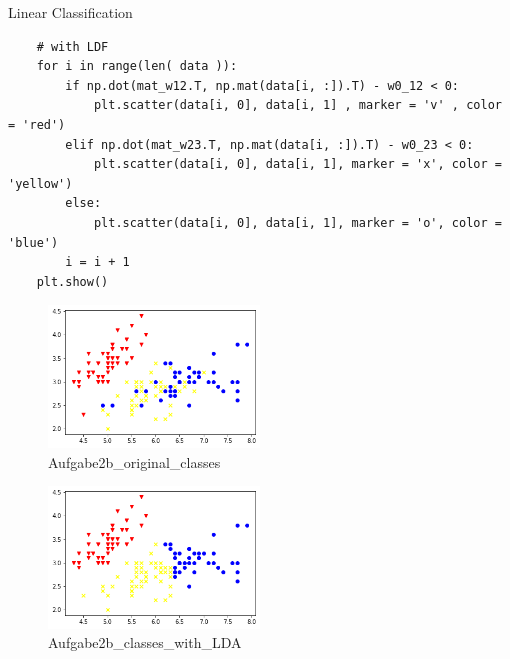\documentclass[
	ngerman,
     solution=true
	]{tudaexercise}
\begin{document}
\begin{task}{Linear Classification}
\begin{subtask}[2b)]
\begin{lstlisting}
    # with LDF
    for i in range(len( data )):
        if np.dot(mat_w12.T, np.mat(data[i, :]).T) - w0_12 < 0:
            plt.scatter(data[i, 0], data[i, 1] , marker = 'v' , color = 'red')
        elif np.dot(mat_w23.T, np.mat(data[i, :]).T) - w0_23 < 0:
            plt.scatter(data[i, 0], data[i, 1], marker = 'x', color = 'yellow')
        else:
            plt.scatter(data[i, 0], data[i, 1], marker = 'o', color = 'blue')
        i = i + 1
    plt.show()
\end{lstlisting}
\begin{figure}[H] 
\centering 
\includegraphics[width=0.5\textwidth]{Aufgabe_2b1.png} 
\caption{Aufgabe2b\_original\_classes } 
\label{Fig.main3}
\end{figure}
\begin{figure}[H] 
\centering 
\includegraphics[width=0.5\textwidth]{Aufgabe_2b2.png} 
\caption{Aufgabe2b\_classes\_with\_LDA } 
\label{Fig.main3}
\end{figure}
\end{subtask}

\end{task}
\newpage
\end{document}
